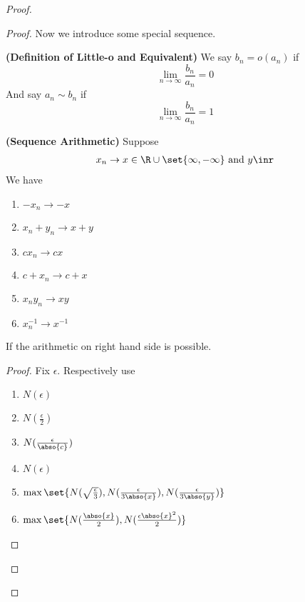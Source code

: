 \documentclass{report}
\begin{document}
\begin{proof}
\begin{proof}
{\begin{minipage}{39em}
Now we introduce some special sequence. 
\end{minipage}}
\begin{definition}
\label{4.1.5}
\textbf{(Definition of Little-o and Equivalent)} We say $b_n=o(a_n)$ if
\begin{equation}
\lim_{n\to\infty}\frac{b_n}{a_n}=0
\end{equation}
And say $a_n\sim b_n$ if
\begin{equation}
\lim_{n\to\infty} \frac{b_n}{a_n}=1
\end{equation}
\end{definition}
\begin{theorem}
\label{4.1.6}
\textbf{(Sequence Arithmetic)} Suppose 
\begin{align*}
x_n \to x \in \R\cup \set{\infty,-\infty}\text{ and }y\inr
\end{align*}
We have 
\begin{enumerate}[label=(\alph*)]
  \item $-x_n \to -x$ 
  \item $x_n+y_n\to x+y$
  \item $cx_n\to cx$
  \item $c+x_n \to c+x$
  \item $x_ny_n \to xy$
  \item  $x_n^{-1}\to x^{-1}$
\end{enumerate}
If the arithmetic on right hand side is possible. 
\end{theorem}
\begin{proof}
Fix $\epsilon $. Respectively use 
\begin{enumerate}[label=(\alph*)]
  \item $N(\epsilon )$
  \item $N(\frac{\epsilon}{2})$
  \item  $N(\frac{\epsilon}{\abso{c}})$ 
  \item $N(\epsilon )$
  \item  $\max \set{N(\sqrt{\frac{\epsilon}{3}} ),N (\frac{\epsilon }{3\abso{x}}),N(\frac{\epsilon }{3\abso{y}})}$
  \item $\max \set{N(\frac{\abso{x}}{2}),N(\frac{\epsilon \abso{x}^2}{2})}$
\end{enumerate}

\end{proof}
\end{proof}
\end{proof}
\end{document}
